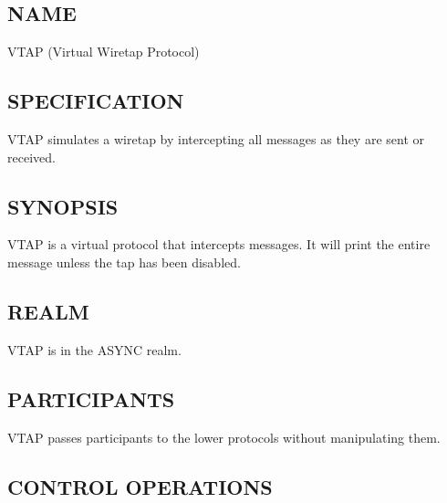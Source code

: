 \subsection*{NAME}

\noindent VTAP (Virtual Wiretap Protocol)

\subsection*{SPECIFICATION}

\noindent 
VTAP simulates a wiretap by intercepting all messages as they are sent
or received.  

\subsection*{SYNOPSIS}

\noindent 
VTAP is a virtual protocol that intercepts messages.  It will print
the entire message unless the tap has been disabled.  

\subsection*{REALM}

VTAP is in the ASYNC realm.

\subsection*{PARTICIPANTS}

VTAP passes participants to the lower protocols without manipulating
them. 

\subsection*{CONTROL OPERATIONS}


